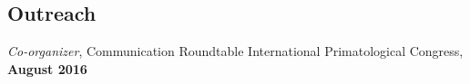 \documentclass[margin,line]{res}
\newenvironment{list2}{
  \begin{list}{$\bullet$}{%
      \setlength{\itemsep}{0in}
      \setlength{\parsep}{0in} \setlength{\parskip}{0in}
      \setlength{\topsep}{0in} \setlength{\partopsep}{0in} 
      \setlength{\leftmargin}{0.2in}}}{\end{list}}
\begin{document}
\begin{resume}
%




\section{\sc Outreach} 


\vspace{-.2cm}
{\em Co-organizer}, Communication Roundtable \hfill International Primatological Congress,  {\bf August 2016}\\
\vspace{-.5cm}


\end{resume}
\end{document}
